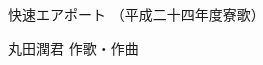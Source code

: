 \documentclass[10pt,b5j]{tarticle} %
\begin{document}
\begin{minipage}[c]{0.7\hsize} %
    \begin{center}
        {\LARGE
            快速エアポート %
        }
        {\small 
            （平成二十四年度寮歌） %
        }
    \end{center}
\end{minipage}
\begin{minipage}[c]{0.3\hsize} %
    \begin{flushright} %
        丸田潤君 作歌・作曲 %
    \end{flushright}
\end{minipage}
\end{document}
